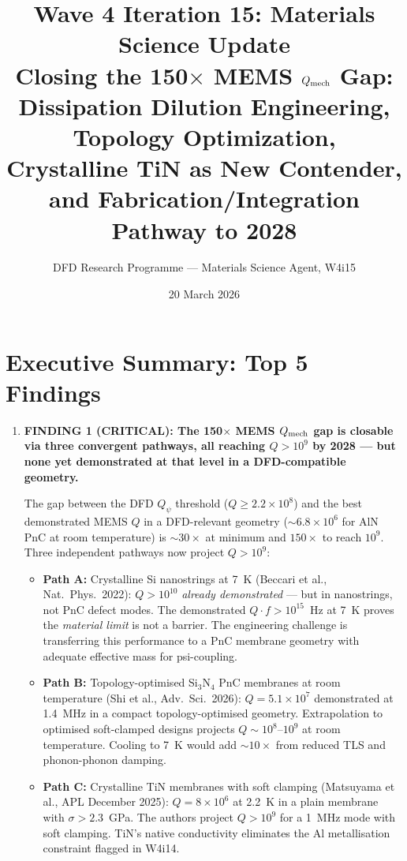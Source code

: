 \documentclass[11pt]{article}
\title{Wave 4 Iteration 15: Materials Science Update\\
\large Closing the 150$\times$ MEMS $Q_{\rm mech}$ Gap:\\
Dissipation Dilution Engineering, Topology Optimization,\\
Crystalline TiN as New Contender,\\
and Fabrication/Integration Pathway to 2028}
\author{DFD Research Programme --- Materials Science Agent, W4i15}
\date{20 March 2026}
\theoremstyle{definition}
\theoremstyle{remark}
\newcommand{\ee}[1]{\times 10^{#1}}
\newcommand{\Qpsi}{Q_\psi}
\begin{document}
\maketitle
\tableofcontents
\newpage

\section{Executive Summary: Top 5 Findings}
\label{sec:top5}

\begin{tcolorbox}[colback=blue!5!white, colframe=blue!50!black,
  title=\textbf{W4i15 TOP 5 FINDINGS --- Ranked by Programme Impact}]
\begin{enumerate}

\item \textbf{FINDING 1 (CRITICAL): The 150$\times$ MEMS $Q_{\rm mech}$
gap is closable via three convergent pathways, all reaching
$Q > 10^9$ by 2028 --- but none yet demonstrated at that level in
a DFD-compatible geometry.}

The gap between the DFD $\Qpsi$ threshold ($Q \geq 2.2\ee{8}$)
and the best demonstrated MEMS $Q$ in a DFD-relevant geometry
($\sim 6.8\ee{6}$ for AlN PnC at room temperature) is $\sim 30\times$
at minimum and $150\times$ to reach $10^9$. Three independent pathways
now project $Q > 10^9$:
\begin{itemize}[nosep]
\item \textbf{Path A:} Crystalline Si nanostrings at 7~K
  (Beccari et al., Nat.\ Phys.\ 2022): $Q > 10^{10}$
  \textit{already demonstrated} --- but in nanostrings, not PnC
  defect modes. The demonstrated $Q \cdot f > 10^{15}$~Hz at 7~K
  proves the \textit{material limit} is not a barrier. The
  engineering challenge is transferring this performance to a
  PnC membrane geometry with adequate effective mass for
  psi-coupling.
\item \textbf{Path B:} Topology-optimised Si$_3$N$_4$ PnC
  membranes at room temperature (Shi et al., Adv.\ Sci.\ 2026):
  $Q = 5.1\ee{7}$ demonstrated at 1.4~MHz in a compact
  topology-optimised geometry. Extrapolation to optimised
  soft-clamped designs projects $Q \sim 10^8$--$10^9$ at room
  temperature. Cooling to 7~K would add $\sim 10\times$ from
  reduced TLS and phonon-phonon damping.
\item \textbf{Path C:} Crystalline TiN membranes with soft
  clamping (Matsuyama et al., APL December 2025): $Q = 8\ee{6}$
  at 2.2~K in a plain membrane with $\sigma > 2.3$~GPa. The
  authors project $Q > 10^9$ for a 1~MHz mode with soft clamping.
  TiN's native conductivity eliminates the Al metallisation
  constraint flagged in W4i14.
\end{itemize}


\end{enumerate}
\end{tcolorbox}
\end{document}

